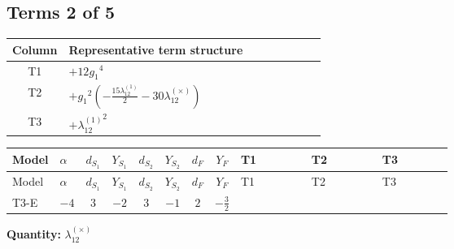 \documentclass[8pt]{article}
\begin{document}
\begin{landscape}
\subsection*{Terms 2 of 5}
\begin{center}
\begin{tabular}{@{}c >{\raggedright\arraybackslash}p{0.82\linewidth}@{}}
\toprule
Column & Representative term structure \\
\midrule
T1 & \(\displaystyle +12 {g_1}^4\) \\
\midrule
T2 & \(\displaystyle +{g_1}^2 \left(-\frac{15 {\lambda_{12}^{(1)}}}{2}-30 {\lambda_{12}^{(\times)}}\right)\) \\
\midrule
T3 & \(\displaystyle +{\lambda_{12}^{(1)}}^2\) \\
\midrule
\bottomrule
\end{tabular}
\end{center}
\smallskip
\tiny
\begin{longtable}{@{}llcccccc >{\raggedright\arraybackslash}p{0.21\linewidth} >{\raggedright\arraybackslash}p{0.21\linewidth} >{\raggedright\arraybackslash}p{0.21\linewidth}@{}}
\toprule
Model & $\alpha$ & $d_{S_1}$ & $Y_{S_1}$ & $d_{S_2}$ & $Y_{S_2}$ & $d_F$ & $Y_F$ & T1 & T2 & T3 \\
\midrule
\endfirsthead
\toprule
Model & $\alpha$ & $d_{S_1}$ & $Y_{S_1}$ & $d_{S_2}$ & $Y_{S_2}$ & $d_F$ & $Y_F$ & T1 & T2 & T3 \\
\midrule
\endhead
T3-E & $-4$ & $3$ & $-2$ & $3$ & $-1$ & $2$ & $-\frac{3}{2}$ & \scriptsize\adjustbox{max width=\linewidth}{$\begin{gathered} +12 {g_1}^4\end{gathered}$} & \scriptsize\adjustbox{max width=\linewidth}{$\begin{gathered} +{g_1}^2 \left(-\frac{15 {\lambda_{12}^{(1)}}}{2}-30 {\lambda_{12}^{(\times)}}\right)\end{gathered}$} & \scriptsize\adjustbox{max width=\linewidth}{$\begin{gathered} +{\lambda_{12}^{(1)}}^2\end{gathered}$} \\
\midrule
\bottomrule
\end{longtable}
\clearpage
\noindent\textbf{Quantity: }$\lambda_{12}^{(\times)}$\par\smallskip

\end{landscape}
\end{document}
